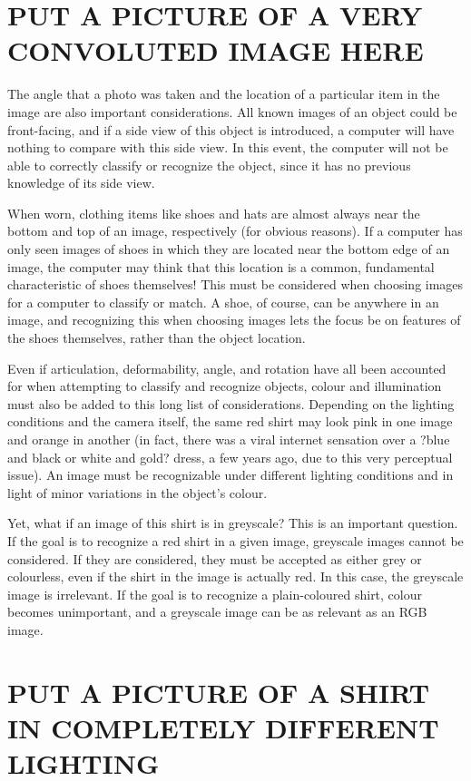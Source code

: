 \documentclass[12pt]{article} %
\begin{document}
 \section{PUT A PICTURE OF A  VERY CONVOLUTED IMAGE HERE }

	The angle that a photo was taken and the location of a particular item in the image are also important considerations. All known images of an object could be front-facing, and if a side view of this object is introduced, a computer will have nothing to compare with this side view. In this event, the computer will not be able to correctly classify or recognize the object, since it has no previous knowledge of its side view. 

	When worn, clothing items like shoes and hats are almost always near the bottom and top of an image, respectively (for obvious reasons). If a computer has only seen images of shoes in which they are located near the bottom edge of an image, the computer may think that this location is a common, fundamental characteristic of shoes themselves! This must be considered when choosing images for a computer to classify or match. A shoe, of course, can be anywhere in an image, and recognizing this when choosing images lets the focus be on features of the shoes themselves, rather than the object location. 
	
	Even if articulation, deformability, angle, and rotation have all been accounted for when attempting to classify and recognize objects, colour and illumination must also be added to this long list of considerations. Depending on the lighting conditions and the camera itself, the same red shirt may look pink in one image and orange in another (in fact, there was a viral internet sensation over a ?blue and black or white and gold? dress, a few years ago, due to this very perceptual issue). An image must be recognizable under different lighting conditions and in light of minor variations in the object's colour. 

	Yet, what if an image of this shirt is in greyscale? This is an important question. If the goal is to recognize a red shirt in a given image, greyscale images cannot be considered. If they are considered, they must be accepted as either grey or colourless, even if the shirt in the image is actually red. In this case, the greyscale image is irrelevant. If the goal is to recognize a plain-coloured shirt, colour becomes unimportant, and a greyscale image can be as relevant as an RGB image.
	
 \section{PUT A PICTURE OF A SHIRT IN COMPLETELY DIFFERENT LIGHTING}
	
\end{document}
